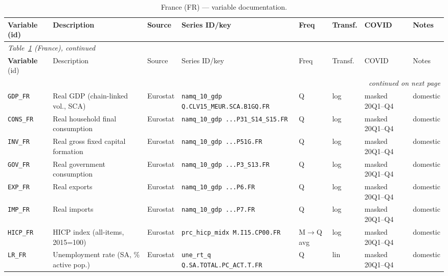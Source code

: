 \begin{longtable}{@{}p{}p{}p{}p{}p{}p{}p{}p{}@{}}
\caption{France (FR) --- variable documentation.}\label{tab:data:FR}\\
\toprule
\textbf{Variable} (id) & Description & Source & Series ID/key & Freq & Transf. & COVID & Notes \\
\midrule
\endfirsthead
\multicolumn{8}{l}{\small\itshape Table~\ref{tab:data:FR} (France), continued}\\
\toprule
\textbf{Variable} (id) & Description & Source & Series ID/key & Freq & Transf. & COVID & Notes \\
\midrule
\endhead
\midrule \multicolumn{8}{r}{\small\itshape continued on next page}\\
\endfoot
\bottomrule
\endlastfoot
\texttt{GDP\_FR}    & Real GDP (chain-linked vol., SCA) & Eurostat & \texttt{namq\_10\_gdp Q.\allowbreak CLV15\_MEUR.\allowbreak SCA.\allowbreak B1GQ.\allowbreak FR} & Q & log & masked 20Q1--Q4 & domestic \\
\texttt{CONS\_FR}   & Real household final consumption & Eurostat & \texttt{namq\_10\_gdp ...\allowbreak P31\_S14\_S15.\allowbreak FR} & Q & log & masked 20Q1--Q4 & domestic \\
\texttt{INV\_FR}    & Real gross fixed capital formation & Eurostat & \texttt{namq\_10\_gdp ...\allowbreak P51G.\allowbreak FR} & Q & log & masked 20Q1--Q4 & domestic \\
\texttt{GOV\_FR}    & Real government consumption & Eurostat & \texttt{namq\_10\_gdp ...\allowbreak P3\_S13.\allowbreak FR} & Q & log & masked 20Q1--Q4 & domestic \\
\texttt{EXP\_FR}    & Real exports & Eurostat & \texttt{namq\_10\_gdp ...\allowbreak P6.\allowbreak FR} & Q & log & masked 20Q1--Q4 & domestic \\
\texttt{IMP\_FR}    & Real imports & Eurostat & \texttt{namq\_10\_gdp ...\allowbreak P7.\allowbreak FR} & Q & log & masked 20Q1--Q4 & domestic \\
\texttt{HICP\_FR}   & HICP index (all-items, 2015=100) & Eurostat & \texttt{prc\_hicp\_midx M.\allowbreak I15.\allowbreak CP00.\allowbreak FR} & M$\to$Q avg & log & masked 20Q1--Q4 & domestic \\
\texttt{LR\_FR}     & Unemployment rate (SA, \% active pop.) & Eurostat & \texttt{une\_rt\_q Q.\allowbreak SA.\allowbreak TOTAL.\allowbreak PC\_ACT.\allowbreak T.\allowbreak FR} & Q & lin & masked 20Q1--Q4 & domestic \\

\end{longtable}
